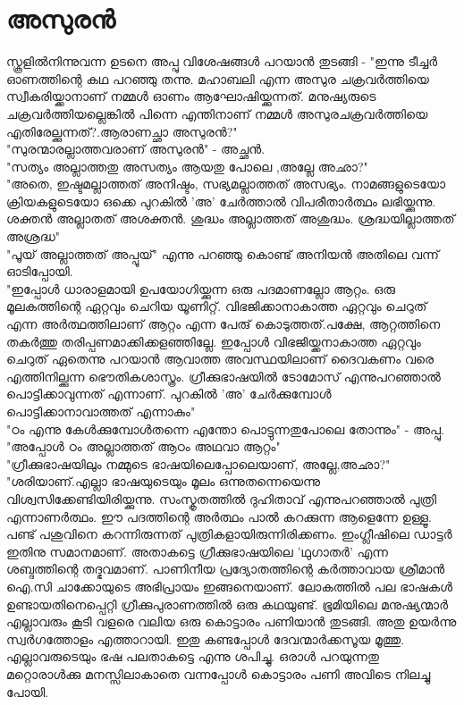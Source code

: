 \section{അസുരൻ}
സ്കൂളിൽനിന്നുവന്ന ഉടനെ അപ്പു വിശേഷങ്ങൾ പറയാൻ തുടങ്ങി - "ഇന്നു ടീച്ചർ ഓണത്തിന്റെ കഥ പറഞ്ഞു തന്നു. മഹാബലി എന്ന അസുര ചക്രവർത്തിയെ സ്വീകരിയ്ക്കാനാണ്‌ നമ്മൾ ഓണം ആഘോഷിയ്ക്കുന്നത്. മനുഷ്യരുടെ ചക്രവർത്തിയല്ലെങ്കിൽ പിന്നെ എന്തിനാണ്‌ നമ്മൾ അസുരചക്രവർത്തിയെ എതിരേല്ക്കുന്നത്?.ആരാണച്ഛാ അസുരൻ?"\\
"സുരന്മാരല്ലാത്തവരാണ്‌ അസുരൻ" - അച്ഛൻ.\\
"സത്യം അല്ലാത്തതു അസത്യം ആയതു പോലെ ,അല്ലേ അഛാ?"\\
"അതെ, ഇഷ്ടമല്ലാത്തത് അനിഷ്ടം, സഭ്യമല്ലാത്തത് അസഭ്യം. നാമങ്ങളുടെയോ ക്രിയകളുടെയോ ഒക്കെ പുറകിൽ 'അ' ചേർത്താൽ വിപരീതാർത്ഥം ലഭിയ്ക്കുന്നു. ശക്തൻ അല്ലാതത് അശക്തൻ. ശുദ്ധം അല്ലാത്തത് അശുദ്ധം. ശ്രദ്ധയില്ലാത്തത് അശ്രദ്ധ"\\
"പൂയ് അല്ലാത്തത് അപ്പൂയ്" എന്നു പറഞ്ഞു കൊണ്ട് അനിയൻ അതിലെ വന്ന് ഓടിപ്പോയി.\\
"ഇപ്പോൾ ധാരാളമായി ഉപയോഗിയ്ക്കുന്ന ഒരു പദമാണല്ലോ ആറ്റം. ഒരു മൂലകത്തിന്റെ ഏറ്റവും ചെറിയ യൂണിറ്റ്. വിഭജിക്കാനാകാത്ത ഏറ്റവും ചെറുത് എന്ന അർത്ഥത്തിലാണ്‌ ആറ്റം എന്ന പേരു് കൊടുത്തത്.പക്ഷേ, ആറ്റത്തിനെ തകർത്തു തരിപ്പണമാക്കിക്കളഞ്ഞില്ലേ. ഇപ്പോൾ വിഭജിയ്ക്കനാകാത്ത ഏറ്റവും ചെറുത് ഏതെന്നു പറയാൻ ആവാത്ത അവസ്ഥയിലാണ്‌ ദൈവകണം വരെ എത്തിനില്ക്കുന്ന ഭൌതികശാസ്ത്രം. ഗ്രീക്കുഭാഷയിൽ ടോമോസ് എന്നുപറഞ്ഞാൽ പൊട്ടിക്കാവുന്നത് എന്നാണ്‌. പുറകിൽ 'അ' ചേർക്കുമ്പോൾ പൊട്ടിക്കാനാവാത്തത് എന്നാകും"\\
"ഠം എന്നു കേൾക്കുമ്പോൾതന്നെ എന്തോ പൊട്ടുന്നതുപോലെ തോന്നും" - അപ്പു.\\
"അപ്പോൾ ഠം അല്ലാത്തത് ആഠം അഥവാ ആറ്റം"\\
"ഗ്രീക്കുഭാഷയിലും നമ്മുടെ ഭാഷയിലെപ്പോലെയാണ്‌, അല്ലേ,അഛാ?"\\
"ശരിയാണ്‌.എല്ലാ ഭാഷയുടെയും മൂലം ഒന്നുതന്നെയെന്നു വിശ്വസിക്കേണ്ടിയിരിയ്ക്കുന്നു. സംസ്കൃതത്തിൽ ദുഹിതാവ് എന്നുപറഞ്ഞാൽ പുത്രി എന്നാണർത്ഥം. ഈ പദത്തിന്റെ അർത്ഥം പാൽ കറക്കുന്ന ആളെന്നേ ഉള്ളൂ. പണ്ട് പശുവിനെ കറന്നിരുന്നത് പുത്രികളായിരുന്നിരിക്കണം. ഇംഗ്ലീഷിലെ ഡാട്ടർ ഇതിനു സമാനമാണ്‌. അതാകട്ടെ ഗ്രീക്കുഭാഷയിലെ 'ഥുഗാതർ' എന്ന ശബ്ദത്തിന്റെ തദ്ഭവമാണ്‌. പാണിനീയ പ്രദ്യോതത്തിന്റെ കർത്താവായ ശ്രീമാൻ ഐ.സി ചാക്കോയുടെ അഭിപ്രായം ഇങ്ങനെയാണ്‌.
ലോകത്തിൽ പല ഭാഷകൾ ഉണ്ടായതിനെപ്പെറ്റി ഗ്രീക്കുപുരാണത്തിൽ ഒരു കഥയുണ്ട്. ഭൂമിയിലെ മനുഷ്യന്മാർ എല്ലാവരും കൂടി വളരെ വലിയ ഒരു കൊട്ടാരം പണിയാൻ തുടങ്ങി. അതു ഉയർന്നു സ്വർഗത്തോളം എത്താറായി. ഇതു കണ്ടപ്പോൾ ദേവന്മാർക്കസൂയ മൂത്തു. എല്ലാവരുടെയും ഭഷ പലതാകട്ടെ എന്നു ശപിച്ചു. ഒരാൾ പറയുന്നതു മറ്റൊരാൾക്കു മനസ്സിലാകാതെ വന്നപ്പോൾ കൊട്ടാരം പണി അവിടെ നിലച്ചു പോയി.\\
